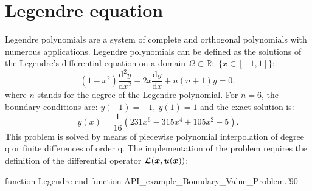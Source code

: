        
\newpage
\section{Legendre equation}
       Legendre polynomials are a system of complete and orthogonal polynomials with numerous applications.
              Legendre polynomials can be defined as the solutions of the Legendre's differential equation on a domain $\Omega \subset 
              \mathbb{R} : $ $\{x\in  [-1,1]\}$:
              \begin{equation*}      	
              (1 - x^2) \frac{\text{d}^2 y}{\text{d} x^2} - 2x \frac{\text{d} y}{\text{d} x} + n (n + 1) y = 0,
              \end{equation*}
              where $ n $ stands for the degree of the Legendre polynomial. 
              For $n = 6$,  the boundary conditions are: $y(-1) = - 1, \  y(1) = 1$ and the exact solution  is:
              \begin{equation*}
              	y(x) = \frac{1}{16}( 231 x^6 - 315 x^4 + 105 x^2 - 5).
              \end{equation*}
              This problem is solved by means of piecewise polynomial interpolation of degree q or finite differences of order q.  The 
              implementation of the problem requires the definition of the differential operator $\boldsymbol{\mathcal{L}} 
              (\boldsymbol{x},\boldsymbol{u}(\boldsymbol{x}))$:
              
              \vspace{0.5cm} 
              {function Legendre}
              {end function}
              {API_example_Boundary_Value_Problem.f90}
                    
